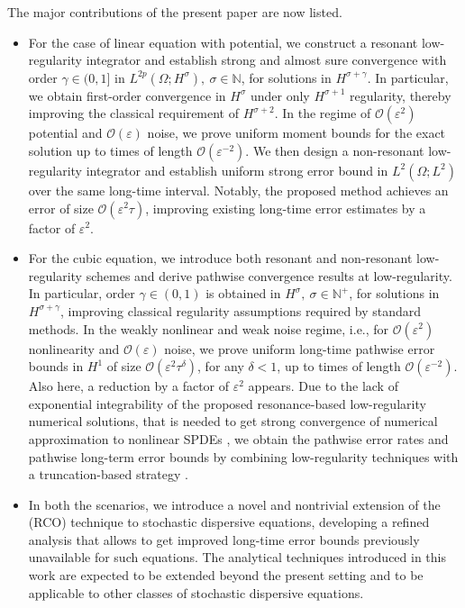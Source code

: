 \documentclass[a4paper]{amsart}
\begin{document}
The major contributions of the present paper are now listed.
\begin{itemize}
\item For the case of linear equation with potential, we construct a resonant low-regularity integrator and establish strong and almost sure convergence with order $\gamma \in (0,1]$ in $L^{2p}(\Omega;H^\sigma), \ \sigma\in\mathbb{N}$, for solutions in $H^{\sigma+\gamma}$. In particular, we obtain first-order convergence in $H^\sigma$ under only $H^{\sigma+1}$ regularity, thereby improving the classical requirement of $H^{\sigma+2}$. In the regime of $\mathcal{O}(\varepsilon^2)$ potential and $\mathcal{O}(\varepsilon)$ noise, we prove uniform moment bounds for the exact solution up to times of length $\mathcal{O}(\varepsilon^{-2})$. We then design a non-resonant low-regularity integrator and establish uniform strong error bound in $L^2(\Omega; L^2)$ over the same long-time interval. Notably, the proposed method achieves an error of size $\mathcal{O}(\varepsilon^2 \tau)$, improving existing long-time error estimates by a factor of $\varepsilon^2$.
\item For the cubic equation, we introduce both resonant and non-resonant low-regularity schemes and derive pathwise convergence results at low-regularity. In particular, order $\gamma\in(0,1)$ is obtained in $H^\sigma, \ \sigma\in\mathbb{N}^+$, for solutions in $H^{\sigma+\gamma}$, improving classical regularity assumptions required by standard methods. In the weakly nonlinear and weak noise regime, i.e., for $\mathcal{O}(\varepsilon^{2})$ nonlinearity and $\mathcal{O}(\varepsilon)$ noise, we prove uniform long-time pathwise error bounds in $H^1$ of size $\mathcal{O}(\varepsilon^2 \tau^\delta)$, for any $\delta<1$, up to times of length $\mathcal{O}(\varepsilon^{-2})$. Also here, a  reduction  by a factor of $\varepsilon^2$ appears. Due to the lack of exponential integrability of the proposed resonance-based low-regularity numerical solutions, that is needed to get strong convergence of numerical approximation to nonlinear SPDEs \cite{cui}, we obtain the pathwise error rates and pathwise long-term error bounds by combining low-regularity techniques with a truncation-based strategy \cite{deb0}. 
\item
In both the scenarios, we introduce a novel and nontrivial extension of the (RCO) technique to stochastic dispersive equations,  developing a refined analysis that allows to get improved long-time error bounds previously unavailable for such equations. The analytical techniques introduced in this work are expected to be extended beyond the present setting and to be applicable to other classes of stochastic dispersive equations.

\end{itemize}
\end{document}

